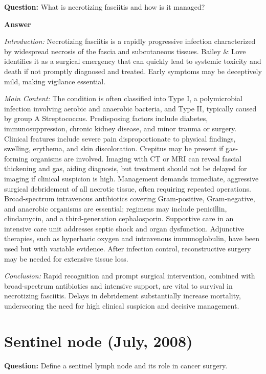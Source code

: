 \documentclass{article}
\begin{document}
\textbf{Question:} What is necrotizing fasciitis and how is it managed?

\textbf{Answer}

\emph{Introduction:} Necrotizing fasciitis is a rapidly progressive infection characterized by widespread necrosis of the fascia and subcutaneous tissues. Bailey \& Love identifies it as a surgical emergency that can quickly lead to systemic toxicity and death if not promptly diagnosed and treated. Early symptoms may be deceptively mild, making vigilance essential.

\emph{Main Content:} The condition is often classified into Type I, a polymicrobial infection involving aerobic and anaerobic bacteria, and Type II, typically caused by group A Streptococcus. Predisposing factors include diabetes, immunosuppression, chronic kidney disease, and minor trauma or surgery. Clinical features include severe pain disproportionate to physical findings, swelling, erythema, and skin discoloration. Crepitus may be present if gas-forming organisms are involved. Imaging with CT or MRI can reveal fascial thickening and gas, aiding diagnosis, but treatment should not be delayed for imaging if clinical suspicion is high. Management demands immediate, aggressive surgical debridement of all necrotic tissue, often requiring repeated operations. Broad-spectrum intravenous antibiotics covering Gram-positive, Gram-negative, and anaerobic organisms are essential; regimens may include penicillin, clindamycin, and a third-generation cephalosporin. Supportive care in an intensive care unit addresses septic shock and organ dysfunction. Adjunctive therapies, such as hyperbaric oxygen and intravenous immunoglobulin, have been used but with variable evidence. After infection control, reconstructive surgery may be needed for extensive tissue loss.

\emph{Conclusion:} Rapid recognition and prompt surgical intervention, combined with broad-spectrum antibiotics and intensive support, are vital to survival in necrotizing fasciitis. Delays in debridement substantially increase mortality, underscoring the need for high clinical suspicion and decisive management.


\section{Sentinel node (July, 2008)}


\textbf{Question:} Define a sentinel lymph node and its role in cancer surgery.
\end{document}
